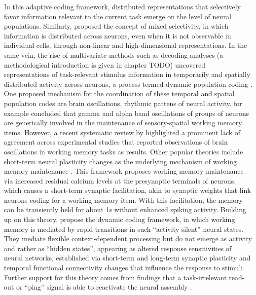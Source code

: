 In this adaptive coding framework, distributed representations that selectively favor information relevant to the current task emerge on the level of neural populations.
Similarly, \citet{rigotti2013importance} proposed the concept of mixed selectivity, in which information is distributed across neurons, even when it is not observable in individual cells, through non-linear and high-dimensional representations.
In the same vein, the rise of multivariate methods such as decoding analyses (a methodological introduction is given in chapter TODO) uncovered representations of task-relevant stimulus information in temporarily and spatially distributed activity across neurons, a process termed dynamic population coding \citep{sreenivasan2014revisiting}.\\
One proposed mechanism for the coordination of these temporal and spatial population codes are brain oscillations, rhythmic pattens of neural activity.
\citet{roux2014working} for example concluded that gamma and alpha band oscillations of groups of neurons are generically involved in the maintenance of sensory-spatial working memory items.
However, a recent systematic review by \citet{pavlov2022oscillatory} highlighted a prominent lack of agreement across experimental studies that reported observations of brain oscillations in working memory tasks as results.
Other popular theories include short-term neural plasticity changes as the underlying mechanism of working memory maintenance \citep{mongillo2008synaptic}.
This framework proposes working memory maintenance via increased residual calcium levels at the presynaptic terminals of neurons, which causes a short-term synaptic facilitation, akin to synaptic weights that link neurons coding for a working memory item.
With this facilitation, the memory can be transiently held for about 1s without enhanced spiking activity.
Building up on this theory,  \citet{stokes2013dynamic, stokes2015activity} propose the dynamic coding framework, in which working memory is mediated by rapid transitions in such ``activity silent'' neural states.
They mediate flexible context-dependent processing but do not emerge as activity and rather as ``hidden states'', appearing as altered response sensitivities of neural networks, established via short-term and long-term synaptic plasticity and temporal functional connectivity changes that influence the response to stimuli.
Further support for this theory comes from findings that a task-irrelevant read-out or ``ping'' signal is able to reactivate the neural assembly \citep{trubutschek2017theory, wolff2017dynamic}.\\
